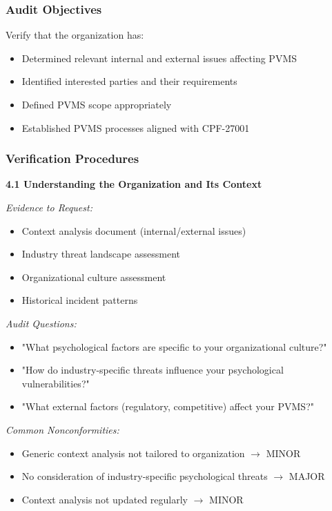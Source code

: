 \documentclass[11pt,a4paper]{article}
\begin{document}
\subsubsection{Audit Objectives}

Verify that the organization has:
\begin{itemize}
\item Determined relevant internal and external issues affecting PVMS
\item Identified interested parties and their requirements
\item Defined PVMS scope appropriately
\item Established PVMS processes aligned with CPF-27001
\end{itemize}

\subsubsection{Verification Procedures}

\textbf{4.1 Understanding the Organization and Its Context}

\textit{Evidence to Request:}
\begin{itemize}
\item Context analysis document (internal/external issues)
\item Industry threat landscape assessment
\item Organizational culture assessment
\item Historical incident patterns
\end{itemize}

\textit{Audit Questions:}
\begin{itemize}
\item "What psychological factors are specific to your organizational culture?"
\item "How do industry-specific threats influence your psychological vulnerabilities?"
\item "What external factors (regulatory, competitive) affect your PVMS?"
\end{itemize}

\textit{Common Nonconformities:}
\begin{itemize}
\item Generic context analysis not tailored to organization $\rightarrow$ MINOR
\item No consideration of industry-specific psychological threats $\rightarrow$ MAJOR
\item Context analysis not updated regularly $\rightarrow$ MINOR
\end{itemize}
\end{document}
